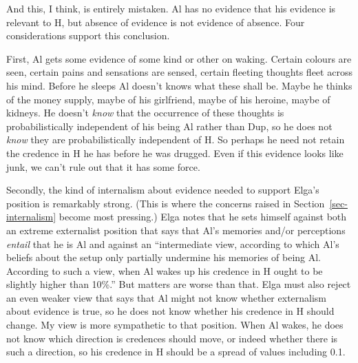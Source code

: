 \documentclass[
  11pt,
  letterpaper,
  DIV=11,
  numbers=noendperiod,
  twoside]{scrartcl}
\begin{document}
And this, I think, is entirely mistaken. Al has no evidence that his
evidence is relevant to H, but absence of evidence is not evidence of
absence. Four considerations support this conclusion.

First, Al gets some evidence of some kind or other on waking. Certain
colours are seen, certain pains and sensations are sensed, certain
fleeting thoughts fleet across his mind. Before he sleeps Al doesn't
knows what these shall be. Maybe he thinks of the money supply, maybe of
his girlfriend, maybe of his heroine, maybe of kidneys. He doesn't
\emph{know} that the occurrence of these thoughts is probabilistically
independent of his being Al rather than Dup, so he does not \emph{know}
they are probabilistically independent of H. So perhaps he need not
retain the credence in H he has before he was drugged. Even if this
evidence looks like junk, we can't rule out that it has some force.

Secondly, the kind of internalism about evidence needed to support
Elga's position is remarkably strong. (This is where the concerns raised
in Section~\ref{sec-internalism} become most pressing.) Elga notes that
he sets himself against both an extreme externalist position that says
that Al's memories and/or perceptions \emph{entail} that he is Al and
against an ``intermediate view, according to which Al's beliefs about
the setup only partially undermine his memories of being Al. According
to such a view, when Al wakes up his credence in H ought to be slightly
higher than 10\%.'' But matters are worse than that. Elga must also
reject an even weaker view that says that Al might not know whether
externalism about evidence is true, so he does not know whether his
credence in H should change. My view is more sympathetic to that
position. When Al wakes, he does not know which direction is credences
should move, or indeed whether there is such a direction, so his
credence in H should be a spread of values including 0.1.
\end{document}

